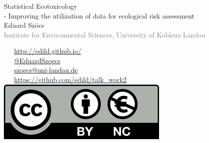 \documentclass[12pt
, t
]{beamer}
\begin{document}
\begin{frame}[plain]
\frametitle{}
\vspace{1em}
\begin{centering}
\Large \textcolor{title}{Statistical Ecotoxicology \\ - Improving the utilization of data for ecological risk assessment} \\[1em]
Eduard Szöcs \\[0.3em]
\tiny \textcolor{gray}{Institute for Environmental Sciences, University of Koblenz-Landau} \\[3em]
\end{centering}
\normalsize
\textcolor{hilight}{\faLaptop}~~~\href{http://edild.github.io/}{http://edild.github.io/ }\\[.5em]
\textcolor{hilight}{\faTwitter}~~~\href{http://twitter.com/EduardSzoecs}{@EduardSzoecs} 	\\[0.5em]
\textcolor{hilight}{\faEnvelope}~~~\href{mailto:szoecs@uni-landau.de}{szoecs@uni-landau.de} \\[.5em]
\textcolor{hilight}{\faGift}~~~\href{https://github.com/edild/talk_work2}{https://github.com/edild/talk\_work2}\\[0.5em]
\hfill \includegraphics[width =.3\textwidth]{fig/Cc-by-nc_euro_icon.png} 
\end{frame}
\end{document}
